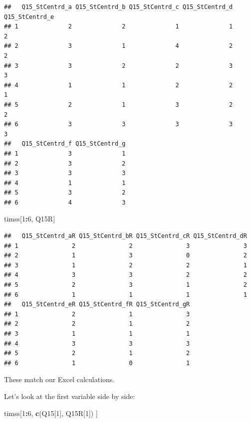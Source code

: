 \documentclass[
]{article}
\newenvironment{Shaded}{\begin{snugshade}}{\end{snugshade}}
\newcommand{\DecValTok}[1]{\textcolor[rgb]{0.00,0.00,0.81}{#1}}
\newcommand{\KeywordTok}[1]{\textcolor[rgb]{0.13,0.29,0.53}{\textbf{#1}}}
\newcommand{\NormalTok}[1]{#1}
\newcommand{\OperatorTok}[1]{\textcolor[rgb]{0.81,0.36,0.00}{\textbf{#1}}}
\begin{document}
\begin{verbatim}
##   Q15_StCentrd_a Q15_StCentrd_b Q15_StCentrd_c Q15_StCentrd_d Q15_StCentrd_e
## 1              2              2              1              1              2
## 2              3              1              4              2              2
## 3              3              2              2              3              3
## 4              1              1              2              2              1
## 5              2              1              3              2              2
## 6              3              3              3              3              3
##   Q15_StCentrd_f Q15_StCentrd_g
## 1              3              1
## 2              3              2
## 3              3              3
## 4              1              1
## 5              3              2
## 6              4              3
\end{verbatim}

\begin{Shaded}
\begin{Highlighting}[]
\NormalTok{timss[}\DecValTok{1}\OperatorTok{:}\DecValTok{6}\NormalTok{, Q15R]}
\end{Highlighting}
\end{Shaded}

\begin{verbatim}
##   Q15_StCentrd_aR Q15_StCentrd_bR Q15_StCentrd_cR Q15_StCentrd_dR
## 1               2               2               3               3
## 2               1               3               0               2
## 3               1               2               2               1
## 4               3               3               2               2
## 5               2               3               1               2
## 6               1               1               1               1
##   Q15_StCentrd_eR Q15_StCentrd_fR Q15_StCentrd_gR
## 1               2               1               3
## 2               2               1               2
## 3               1               1               1
## 4               3               3               3
## 5               2               1               2
## 6               1               0               1
\end{verbatim}

These match our Excel calculations.

Let's look at the first variable side by side:

\begin{Shaded}
\begin{Highlighting}[]
\NormalTok{timss[}\DecValTok{1}\OperatorTok{:}\DecValTok{6}\NormalTok{, }\KeywordTok{c}\NormalTok{(Q15[}\DecValTok{1}\NormalTok{], Q15R[}\DecValTok{1}\NormalTok{]) ] }
\end{Highlighting}
\end{Shaded}
\end{document}
